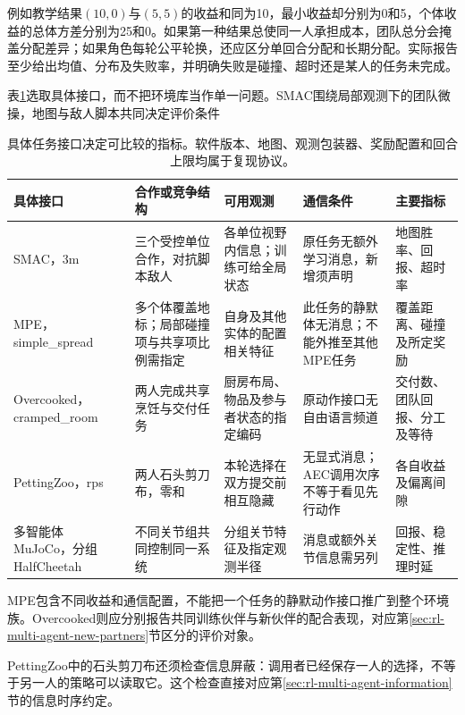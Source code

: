 例如教学结果$(10,0)$与$(5,5)$的收益和同为10，最小收益却分别为0和5，个体收益的总体方差分别为25和0。如果第一种结果总使同一人承担成本，团队总分会掩盖分配差异；如果角色每轮公平轮换，还应区分单回合分配和长期分配。实际报告至少给出均值、分布及失败率，并明确失败是碰撞、超时还是某人的任务未完成。

表\ref{tab:rl-multi-agent-benchmarks}选取具体接口，而不把环境库当作单一问题。SMAC围绕局部观测下的团队微操，地图与敌人脚本共同决定评价条件

\begin{table}[t]
 \centering
 \begin{tabularx}{\linewidth}{@{}l >{\raggedright\arraybackslash}X >{\raggedright\arraybackslash}X >{\raggedright\arraybackslash}X >{\raggedright\arraybackslash}X@{}}
 \toprule
 具体接口 & 合作或竞争结构 & 可用观测 & 通信条件 & 主要指标\\
 \midrule
 SMAC，3m & 三个受控单位合作，对抗脚本敌人 & 各单位视野内信息；训练可给全局状态 & 原任务无额外学习消息，新增须声明 & 地图胜率、回报、超时率\\
 MPE，simple\_spread & 多个体覆盖地标；局部碰撞项与共享项比例需指定 & 自身及其他实体的配置相关特征 & 此任务的静默体无消息；不能外推至其他MPE任务 & 覆盖距离、碰撞及所定奖励\\
 Overcooked，cramped\_room & 两人完成共享烹饪与交付任务 & 厨房布局、物品及参与者状态的指定编码 & 原动作接口无自由语言频道 & 交付数、团队回报、分工及等待\\
 PettingZoo，rps & 两人石头剪刀布，零和 & 本轮选择在双方提交前相互隐藏 & 无显式消息；AEC调用次序不等于看见先行动作 & 各自收益及偏离间隙\\
 多智能体MuJoCo，分组HalfCheetah & 不同关节组共同控制同一系统 & 分组关节特征及指定观测半径 & 消息或额外关节信息需另列 & 回报、稳定性、推理时延\\
 \bottomrule
 \end{tabularx}
 \caption{具体任务接口决定可比较的指标。软件版本、地图、观测包装器、奖励配置和回合上限均属于复现协议。}
 \label{tab:rl-multi-agent-benchmarks}
\end{table}

MPE包含不同收益和通信配置，不能把一个任务的静默动作接口推广到整个环境族。Overcooked则应分别报告共同训练伙伴与新伙伴的配合表现，对应第\ref{sec:rl-multi-agent-new-partners}节区分的评价对象。

PettingZoo中的石头剪刀布还须检查信息屏蔽：调用者已经保存一人的选择，不等于另一人的策略可以读取它。这个检查直接对应第\ref{sec:rl-multi-agent-information}节的信息时序约定。

